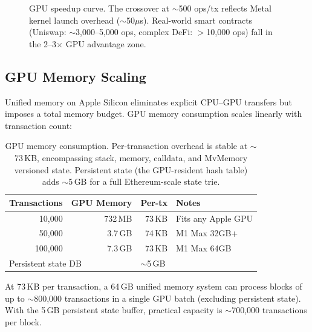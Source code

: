 \begin{figure}[h]
\centering
{}
\caption{GPU speedup curve. The crossover at $\sim$500 ops/tx reflects Metal kernel launch
overhead ($\sim$50$\mu$s). Real-world smart contracts (Uniswap: $\sim$3{,}000--5{,}000 ops,
complex DeFi: $>$10{,}000 ops) fall in the 2--3$\times$ GPU advantage zone.}
\label{fig:crossover}
\end{figure}

\subsection{GPU Memory Scaling}

Unified memory on Apple Silicon eliminates explicit CPU--GPU transfers but imposes a
total memory budget. GPU memory consumption scales linearly with transaction count:

\begin{table}[h]
\centering
\small
\begin{tabular}{rrrl}
\toprule
\textbf{Transactions} & \textbf{GPU Memory} & \textbf{Per-tx} & \textbf{Notes} \\
\midrule
10{,}000  & 732\,MB  & 73\,KB  & Fits any Apple GPU \\
50{,}000  & 3.7\,GB  & 74\,KB  & M1 Max 32GB+ \\
100{,}000 & 7.3\,GB  & 73\,KB  & M1 Max 64GB \\
\midrule
\multicolumn{2}{l}{Persistent state DB} & \multicolumn{2}{l}{$\sim$5\,GB} \\
\bottomrule
\end{tabular}
\caption{GPU memory consumption. Per-transaction overhead is stable at $\sim$73\,KB,
encompassing stack, memory, calldata, and MvMemory versioned state. Persistent state
(the GPU-resident hash table) adds $\sim$5\,GB for a full Ethereum-scale state trie.}
\label{tab:gpumem}
\end{table}

At 73\,KB per transaction, a 64\,GB unified memory system can process blocks of up to
$\sim$800{,}000 transactions in a single GPU batch (excluding persistent state). With the
5\,GB persistent state buffer, practical capacity is $\sim$700{,}000 transactions per block.

